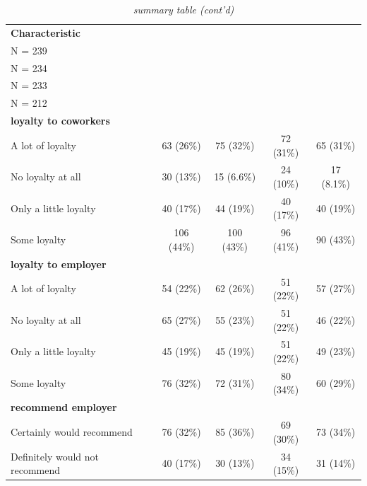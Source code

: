 \documentclass[
  11pt,
  oneside]{article}
\begin{document}
\begin{table}

\caption{\label{tab:tab-sum-wmt}\textit{summary table (cont'd)}}
\centering
\begin{tabular}[t]{l|c|c|c|c}
\hline
\textbf{Characteristic} & \makecell[c]{\textbf{ctrl}\ \ \\N = 239} & \makecell[c]{\textbf{vid0}\ \ \\N = 234} & \makecell[c]{\textbf{vidChar}\ \ \\N = 233} & \makecell[c]{\textbf{vidSolid}\ \ \\N = 212}\\
\hline
\textbf{loyalty to coworkers} &  &  &  & \\
\hline
\hspace{1em}A lot of loyalty & 63 (26\%) & 75 (32\%) & 72 (31\%) & 65 (31\%)\\
\hline
\hspace{1em}No loyalty at all & 30 (13\%) & 15 (6.6\%) & 24 (10\%) & 17 (8.1\%)\\
\hline
\hspace{1em}Only a little loyalty & 40 (17\%) & 44 (19\%) & 40 (17\%) & 40 (19\%)\\
\hline
\hspace{1em}Some loyalty & 106 (44\%) & 100 (43\%) & 96 (41\%) & 90 (43\%)\\
\hline
\textbf{loyalty to employer} &  &  &  & \\
\hline
\hspace{1em}A lot of loyalty & 54 (22\%) & 62 (26\%) & 51 (22\%) & 57 (27\%)\\
\hline
\hspace{1em}No loyalty at all & 65 (27\%) & 55 (23\%) & 51 (22\%) & 46 (22\%)\\
\hline
\hspace{1em}Only a little loyalty & 45 (19\%) & 45 (19\%) & 51 (22\%) & 49 (23\%)\\
\hline
\hspace{1em}Some loyalty & 76 (32\%) & 72 (31\%) & 80 (34\%) & 60 (29\%)\\
\hline
\textbf{recommend employer} &  &  &  & \\
\hline
\hspace{1em}Certainly would recommend & 76 (32\%) & 85 (36\%) & 69 (30\%) & 73 (34\%)\\
\hline
\hspace{1em}Definitely would not recommend & 40 (17\%) & 30 (13\%) & 34 (15\%) & 31 (14\%)\\

\end{tabular}
\end{table}
\end{document}
